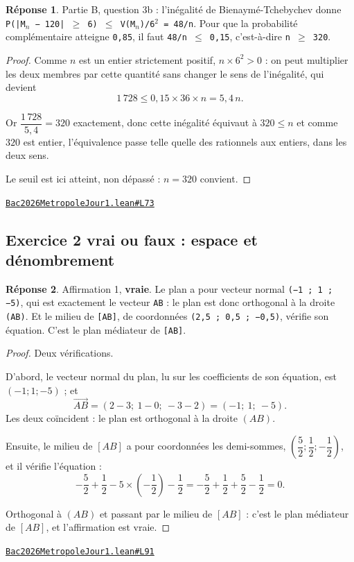 \documentclass[11pt,a4paper]{article}
\theoremstyle{definition}
\theoremstyle{plain}
\theoremstyle{definition}
\newtheorem*{reponse}{Réponse}
\newcommand{\source}[2]{\par\smallskip\noindent\hfill{\footnotesize\href{#1}{\texttt{#2}}}\par\smallskip}
\begin{document}
\begin{reponse}
Partie B, question 3b : l'inégalité de Bienaymé-Tchebychev donne
\texttt{P(|M\(_{n}\) − 120| \(\ge\) 6) \(\le\) V(M\(_{n}\))/6\(^{2}\) = 48/n}. Pour que la probabilité complémentaire
atteigne \texttt{0,85}, il faut \texttt{48/n \(\le\) 0,15}, c'est-à-dire \texttt{n \(\ge\) 320}.
\end{reponse}
\begin{proof}
Comme $n$ est un entier strictement positif, $n \times 6^2 > 0$ : on peut multiplier les
deux membres par cette quantité sans changer le sens de l'inégalité, qui devient
\[ 1\,728 \le 0{,}15 \times 36 \times n = 5{,}4\,n . \]

Or $\dfrac{1\,728}{5{,}4} = 320$ exactement, donc cette inégalité équivaut à
$320 \le n$ \textemdash{} et comme $320$ est entier, l'équivalence passe telle quelle des
rationnels aux entiers, dans les deux sens.

Le seuil est ici atteint, non dépassé : $n = 320$ convient.
\end{proof}
\source{https://github.com/Commutator-IO/learn-lean/blob/main/exams/2026/Bac2026MetropoleJour1.lean\#L73}{Bac2026MetropoleJour1.lean\#L73}

\subsection{Exercice 2 \textemdash{} vrai ou faux : espace et dénombrement}

\begin{reponse}
Affirmation 1, \textbf{vraie}. Le plan a pour vecteur normal \texttt{(−1 ; 1 ; −5)}, qui est
exactement le vecteur \texttt{AB} : le plan est donc orthogonal à la droite \texttt{(AB)}. Et le
milieu de \texttt{[AB]}, de coordonnées \texttt{(2,5 ; 0,5 ; −0,5)}, vérifie son équation. C'est
le plan médiateur de \texttt{[AB]}.
\end{reponse}
\begin{proof}
Deux vérifications.

D'abord, le vecteur normal du plan, lu sur les coefficients de son équation, est
$(-1 ; 1 ; -5)$ ; et
\[ \vec{AB} = (2 - 3 ;\ 1 - 0 ;\ -3 - 2) = (-1 ;\ 1 ;\ -5) . \]
Les deux coïncident : le plan est orthogonal à la droite $(AB)$.

Ensuite, le milieu de $[AB]$ a pour coordonnées les demi-sommes,
$\left(\dfrac{5}{2} ; \dfrac{1}{2} ; -\dfrac{1}{2}\right)$, et il vérifie l'équation :
\[ -\frac{5}{2} + \frac{1}{2} - 5 \times \left(-\frac{1}{2}\right) - \frac{1}{2}
   = -\frac{5}{2} + \frac{1}{2} + \frac{5}{2} - \frac{1}{2} = 0 . \]

Orthogonal à $(AB)$ et passant par le milieu de $[AB]$ : c'est le plan médiateur de
$[AB]$, et l'affirmation est vraie.
\end{proof}
\source{https://github.com/Commutator-IO/learn-lean/blob/main/exams/2026/Bac2026MetropoleJour1.lean\#L91}{Bac2026MetropoleJour1.lean\#L91}
\end{document}
